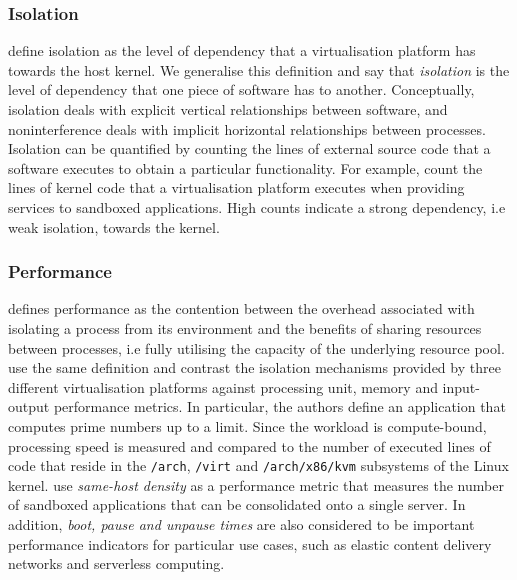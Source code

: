 \subsubsection{Isolation}
\label{ch:fundamentals/virtualisation/axioms/isolation}
\textcite{10.1145/3381052.3381315} define isolation as the level of dependency that a virtualisation 
platform has towards the host kernel. We generalise this definition and say that \textit{isolation} 
is the level of dependency that one piece of software has to another. Conceptually, isolation 
deals with explicit vertical relationships between software, and noninterference deals with 
implicit horizontal relationships between processes. Isolation can be quantified by counting the 
lines of external source code that a software executes to obtain a particular functionality. 
For example, \textcite{10.1145/3381052.3381315} count the lines of kernel code 
that a virtualisation platform executes when providing services to sandboxed applications. 
High counts indicate a strong dependency, i.e weak isolation, towards the kernel. 

\subsubsection{Performance}
\label{ch:fundamentals/virtualisation/axioms/performance}
\textcite{10.1145/3365199} defines performance as the contention between the overhead associated 
with isolating a process from its environment and the benefits of sharing resources between processes,
i.e fully utilising the capacity of the underlying resource pool. 
\textcite{10.1145/3381052.3381315} use the same definition and contrast the isolation mechanisms provided
by three different virtualisation platforms against processing unit, memory and input-output performance metrics. 
In particular, the authors define an application that computes prime numbers up to a limit. 
Since the workload is compute-bound, processing speed is measured and compared to the
number of executed lines of code that reside in the \verb|/arch|, \verb|/virt| and \verb|/arch/x86/kvm|
subsystems of the Linux kernel. \textcite{10.1145/3132747.3132763} use \textit{same-host density} as a 
performance metric that measures the number of sandboxed applications that can be consolidated onto a single server.
In addition, \textit{boot, pause and unpause times} are also considered to be important performance indicators for particular 
use cases, such as elastic content delivery networks \cite{10.1145/3050748.3050757} \cite{10.1145/3132747.3132763}
and serverless computing.


